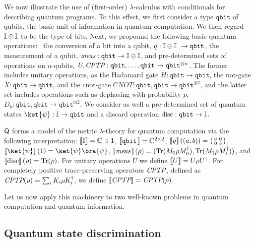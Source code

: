 We now illustrate the use of (first-order) $\lambda$-calculus with conditionals for describing quantum
programs. To this effect, we first consider a type $\mathtt{qbit}$ of qubits, the
basic unit of information in quantum computation. We then regard $\mathbb{I} \oplus
\mathbb{I}$ to be the type of bits. Next, we propound the following
basic quantum operations:  the conversion of a bit into a qubit, $q : \typeI
\oplus \typeI  \to \mathtt{qbit}$, the measurement of a qubit,
$\emph{meas}:\mathtt{qbit} \to \mathbb{I} \oplus \mathbb{I}$, and pre-determined sets of
operations on $n$-qubits, $\emph{U},\emph{CPTP}:\mathtt{qbit},\ldots,\mathtt{qbit} \to
\mathtt{qbit}^{\otimes n}$. The former includes unitary operations, as the Hadamard
gate $H : \mathtt{qbit} \to \mathtt{qbit}$, the not-gate $X : \mathtt{qbit} \to
\mathtt{qbit}$, and the cnot-gate $CNOT : \mathtt{qbit},\mathtt{qbit} \to
\mathtt{qbit}^{\otimes 2}$, and the latter set includes operations such as dephasing with probability $p$, $D_p : \mathtt{qbit},\mathtt{qbit} \to
\mathtt{qbit}^{\otimes 2}$. We consider as well a pre-determined set of quantum
states $\ket{\psi} : \typeI \to \mathtt{qbit}$ and a discard operation $\text{disc}: \mathtt{qbit} \to \mathbb{I}$.  

$\mathsf{Q}$ forms a model of the metric $\lambda$-theory for quantum computation via the following interpretation: $\left \llbracket \mathbb{I} \right \rrbracket= \mathbb{C} \ni  1$, 
$\left \llbracket \mathtt{qbit} \hspace{1pt} \right \rrbracket= \mathbb{C}^{2\times2}$, 
$\left \llbracket \emph{q} \hspace{1pt} \right \rrbracket((a,b)) = \big(\begin{smallmatrix}
  a & 0\\
  0 & b
\end{smallmatrix}\big)$, 
 $\sem{\ket{\psi}} (1)= \ket{\psi} \bra{\psi}$,
$\left \llbracket \emph{meas} \hspace{1pt} \right \rrbracket (\rho)= (\text{Tr} (M_{0} \rho M_{0}^{\dag}), \text{Tr} (M_{1} \rho M_{1}^{\dag}))$, and $\left \llbracket \text{disc} \right \rrbracket (\rho)= \text{Tr} (\rho)$.
For unitary operations $U$ we define $\left \llbracket U \right \rrbracket= U \rho U^{\dag}$.
For completely positive trace-preserving operators $\emph{CPTP}$, defined as $\emph{CPTP} (\rho) = \sum_i K_i \rho K_i^{\dag}$, we define  $\left \llbracket \emph{CPTP} \right \rrbracket = \emph{CPTP}(\rho)$.

Let us now apply this machinery to two well-known problems in quantum computation
and quantum information.

\subsection{Quantum state discrimination}


